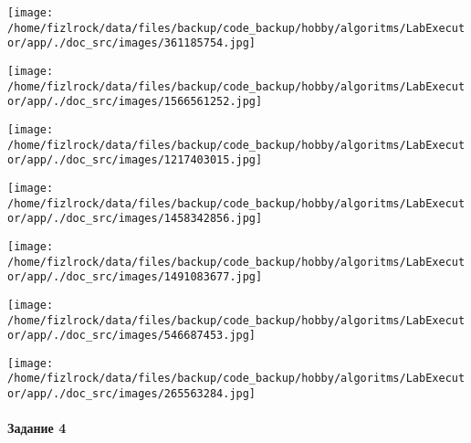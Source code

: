 \documentclass[a4paper, 12pt]{article}
\begin{document}
\texttt{[image: /home/fizlrock/data/files/backup/code\_backup/hobby/algoritms/LabExecutor/app/./doc\_src/images/361185754.jpg]}

\texttt{[image: /home/fizlrock/data/files/backup/code\_backup/hobby/algoritms/LabExecutor/app/./doc\_src/images/1566561252.jpg]}

\texttt{[image: /home/fizlrock/data/files/backup/code\_backup/hobby/algoritms/LabExecutor/app/./doc\_src/images/1217403015.jpg]}

\texttt{[image: /home/fizlrock/data/files/backup/code\_backup/hobby/algoritms/LabExecutor/app/./doc\_src/images/1458342856.jpg]}

\texttt{[image: /home/fizlrock/data/files/backup/code\_backup/hobby/algoritms/LabExecutor/app/./doc\_src/images/1491083677.jpg]}

\texttt{[image: /home/fizlrock/data/files/backup/code\_backup/hobby/algoritms/LabExecutor/app/./doc\_src/images/546687453.jpg]}

\texttt{[image: /home/fizlrock/data/files/backup/code\_backup/hobby/algoritms/LabExecutor/app/./doc\_src/images/265563284.jpg]}
\pagebreak
\paragraph{Задание 4}
\end{document}
